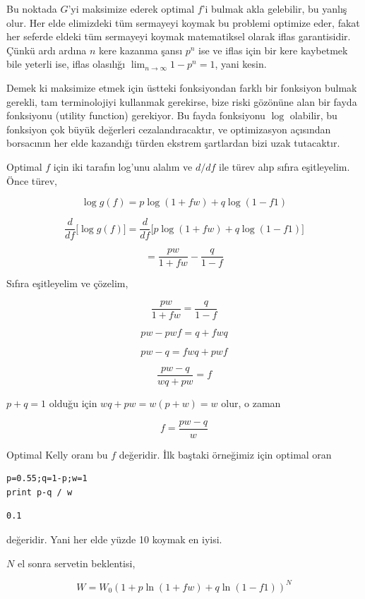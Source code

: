 \documentclass[12pt,fleqn]{article}\usepackage{../../common}
\begin{document}
Bu noktada $G$'yi maksimize ederek optimal $f$'i bulmak akla gelebilir, bu
yanlış olur. Her elde elimizdeki tüm sermayeyi koymak bu problemi optimize
eder, fakat her seferde eldeki tüm sermayeyi koymak matematiksel olarak
iflas garantisidir. Çünkü ardı ardına $n$ kere kazanma şansı $p^n$ ise ve
iflas için bir kere kaybetmek bile yeterli ise, iflas olasılığı
$\lim_{n \to \infty} 1-p^n = 1$, yani kesin.

Demek ki maksimize etmek için üstteki fonksiyondan farklı bir fonksiyon bulmak
gerekli, tam terminolojiyi kullanmak gerekirse, bize riski gözönüne alan
bir fayda fonksiyonu (utility function) gerekiyor. Bu fayda fonksiyonu
$\log$ olabilir, bu fonksiyon çok büyük değerleri cezalandıracaktır, ve
optimizasyon açısından borsacının her elde kazandığı türden ekstrem
şartlardan bizi uzak tutacaktır. 

Optimal $f$ için iki tarafın log'unu alalım ve $d/df$ ile türev alıp sıfıra
eşitleyelim. Önce türev,

$$ \log g(f) = p \log (1+fw) + q \log (1-f1) $$

$$ \frac{d}{df}\big[ \log g(f) \big] = 
\frac{d}{df}\big[ p \log (1+fw) + q \log (1-f1)  \big]
$$


$$ = 
\frac{pw}{1+fw}  - \frac{q}{1-f}
$$

Sıfıra eşitleyelim ve çözelim,

$$ 
\frac{pw}{1+fw} = \frac{q}{1-f}
$$

$$ pw - pwf = q + fwq $$

$$ pw - q = fwq + pwf $$

$$ \frac{pw - q}{wq + pw} = f$$

$p+q = 1$ olduğu için $wq + pw = w(p+w) = w$ olur, o zaman 

$$ f = \frac{pw - q}{w} $$

Optimal Kelly oranı bu $f$ değeridir. İlk baştaki örneğimiz için optimal oran

\begin{verbatim}
p=0.55;q=1-p;w=1
print p-q / w
\end{verbatim}

\begin{verbatim}
0.1
\end{verbatim}

değeridir. Yani her elde yüzde 10 koymak en iyisi. 

$N$ el sonra servetin beklentisi, 

$$ W = W_0 (1 + p \ln (1+fw) + q \ln (1-f1) )^N$$
\end{document}
